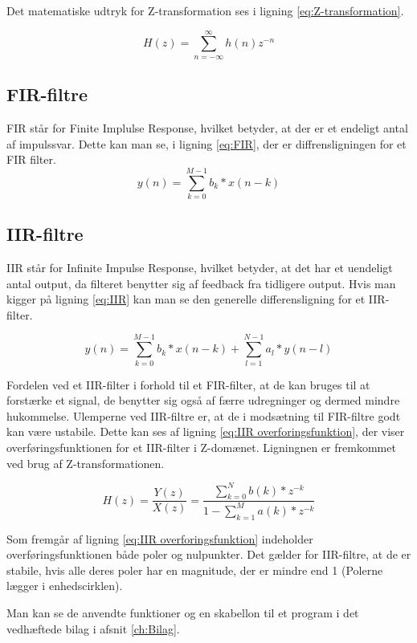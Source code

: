 Det matematiske udtryk for Z-transformation ses i ligning \ref{eq:Z-transformation}.

\begin{equation}\label{eq:Z-transformation}
{H(z)} = \displaystyle\sum_{n=-\infty }^{\infty} {h(n)z^{-n}}
\end{equation}
 
\subsection{FIR-filtre}
FIR står for Finite Implulse Response, hvilket betyder, at der er et endeligt antal af impulssvar.
Dette kan man se, i ligning \eqref{eq:FIR}, der er diffrensligningen for et FIR filter.
\begin{equation}\label{eq:FIR}
{y(n)} = \displaystyle\sum_{k=0}^{M-1} {b_{k}*x(n-k)}
\end{equation}


\subsection{IIR-filtre}
IIR står for Infinite Impulse Response, hvilket betyder, at det har et uendeligt antal output, da filteret benytter sig af feedback fra tidligere output. Hvis man kigger på ligning \eqref{eq:IIR} kan man se den generelle differensligning for et IIR-filter.


\begin{equation}\label{eq:IIR}
{y(n)} = \displaystyle\sum_{k=0}^{M-1} {b_{k}*x(n-k)}+\displaystyle\sum_{l=1}^{N-1} {a_{l}*y(n-l)}
\end{equation}

Fordelen ved et IIR-filter i forhold til et FIR-filter, at de kan bruges til at forstærke et signal, de benytter sig også af færre udregninger og dermed mindre hukommelse. 
Ulemperne ved IIR-filtre er, at de i modsætning til FIR-filtre godt kan være ustabile. 
Dette kan ses af ligning \eqref{eq:IIR overforingsfunktion}, der viser overføringsfunktionen for et IIR-filter i Z-domænet. Ligningnen er fremkommet ved brug af Z-transformationen.

\begin{equation}\label{eq:IIR overforingsfunktion}
{H(z)} =\frac{Y(z)}{X(z)} =\frac{\displaystyle\sum_{k=0}^{N} {b(k)*z^{-k}}}{1-\displaystyle\sum_{k=1}^{M} {a(k)*z^{-k}}}
\end{equation}

Som fremgår af ligning \eqref{eq:IIR overforingsfunktion} indeholder overføringsfunktionen både poler og nulpunkter. Det gælder for IIR-filtre, at de er stabile, hvis alle deres poler har en magnitude, der er mindre end 1 (Polerne lægger i enhedscirklen).


Man kan se de anvendte funktioner og en skabellon til et program i det vedhæftede bilag i afsnit \ref{ch:Bilag}.



